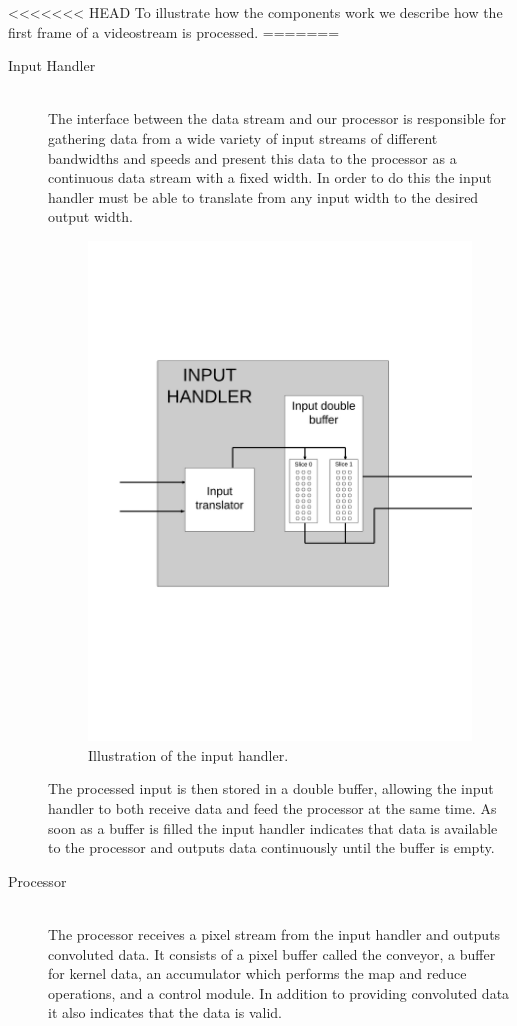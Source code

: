 <<<<<<< HEAD
To illustrate how the components work we describe how the first frame of a videostream is processed.
=======
\begin{description}
    \item[Input Handler] \hfill\\ 
        The interface between the data stream and our processor is responsible for gathering data from a wide variety of input streams of different bandwidths and speeds and present this data to the processor as a continuous data stream with a fixed width.
        In order to do this the input handler must be able to translate from any input width to the desired output width.

\begin{figure}[h!]
    \includegraphics[width=\linewidth]{img/input_handler.png}
    \caption{Illustration of the input handler.}
    \label{fig:Convolution}
\end{figure}

        The processed input is then stored in a double buffer, allowing the input handler to both receive data and feed the processor at the same time.
        As soon as a buffer is filled the input handler indicates that data is available to the processor and outputs data continuously until the buffer is empty.
    \item[Processor] \hfill\\
        The processor receives a pixel stream from the input handler and outputs convoluted data. It consists of a pixel buffer called the conveyor, a buffer for kernel data, an accumulator which performs the map and reduce operations, and a control module. In addition to providing convoluted data it also indicates that the data is valid.


\end{description}
